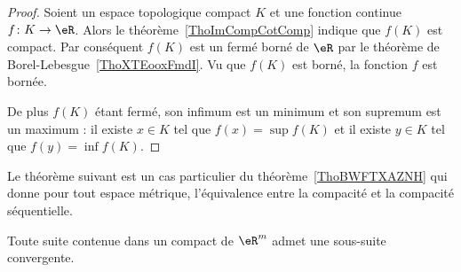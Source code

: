 \begin{proof}
    Soient un espace topologique compact \( K\) et une fonction continue \( f\colon K\to \eR\). Alors le théorème~\ref{ThoImCompCotComp} indique que \( f(K)\) est compact. Par conséquent \( f(K)\) est un fermé borné de \( \eR\) par le théorème de Borel-Lebesgue~\ref{ThoXTEooxFmdI}. Vu que \( f(K)\) est borné, la fonction \( f\) est bornée.

    De plus \( f(K)\) étant fermé, son infimum est un minimum et son supremum est un maximum : il existe \( x\in K\) tel que \( f(x)=\sup f(K)\) et il existe \( y\in K\) tel que \( f(y)=\inf f(K)\).
\end{proof}

Le théorème suivant est un cas particulier du théorème~\ref{ThoBWFTXAZNH} qui donne pour tout espace métrique, l'équivalence entre la compacité et la compacité séquentielle.
\begin{theorem}		\label{ThoBolzanoWeierstrassRn}
	Toute suite contenue dans un compact de \( \eR^m\) admet une sous-suite convergente.
\end{theorem}

